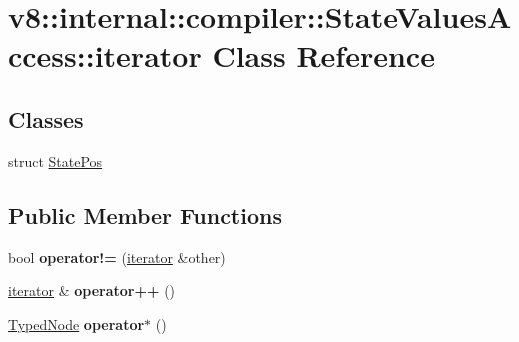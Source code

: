 \hypertarget{classv8_1_1internal_1_1compiler_1_1_state_values_access_1_1iterator}{}\section{v8\+:\+:internal\+:\+:compiler\+:\+:State\+Values\+Access\+:\+:iterator Class Reference}
\label{classv8_1_1internal_1_1compiler_1_1_state_values_access_1_1iterator}
\subsection*{Classes}
\begin{DoxyCompactItemize}
\item 
struct \hyperlink{structv8_1_1internal_1_1compiler_1_1_state_values_access_1_1iterator_1_1_state_pos}{State\+Pos}
\end{DoxyCompactItemize}
\subsection*{Public Member Functions}
\begin{DoxyCompactItemize}
\item 
bool {\bfseries operator!=} (\hyperlink{classv8_1_1internal_1_1compiler_1_1_state_values_access_1_1iterator}{iterator} \&other)\hypertarget{classv8_1_1internal_1_1compiler_1_1_state_values_access_1_1iterator_a12428ede806c832b11b3f578d5b66630}{}\label{classv8_1_1internal_1_1compiler_1_1_state_values_access_1_1iterator_a12428ede806c832b11b3f578d5b66630}

\item 
\hyperlink{classv8_1_1internal_1_1compiler_1_1_state_values_access_1_1iterator}{iterator} \& {\bfseries operator++} ()\hypertarget{classv8_1_1internal_1_1compiler_1_1_state_values_access_1_1iterator_a37af8d22f9f63807961d2a60b8337ea8}{}\label{classv8_1_1internal_1_1compiler_1_1_state_values_access_1_1iterator_a37af8d22f9f63807961d2a60b8337ea8}

\item 
\hyperlink{structv8_1_1internal_1_1compiler_1_1_state_values_access_1_1_typed_node}{Typed\+Node} {\bfseries operator$\ast$} ()\hypertarget{classv8_1_1internal_1_1compiler_1_1_state_values_access_1_1iterator_aeb599e9b153780dd735e91936764f434}{}\label{classv8_1_1internal_1_1compiler_1_1_state_values_access_1_1iterator_aeb599e9b153780dd735e91936764f434}

\end{DoxyCompactItemize}
